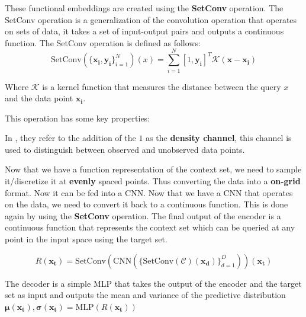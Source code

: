 \documentclass[../../main.tex]{subfiles}
\begin{document}
These functional embeddings are created using the \textbf{SetConv} operation. The SetConv operation is a generalization of the convolution operation that operates on sets of data, it takes a set of input-output pairs and outputs a continuous function. The SetConv operation is defined as follows:
\begin{equation}
	\text{SetConv}(\{\bm{x_i}, \bm{y_i}\}_{i=1}^{N})(x) = \sum_{i=1}^{N} [1, \bm{y_i}] ^ T \mathcal{K}(\bm{x} - \bm{x_i})
\end{equation}

Where $\mathcal{K}$ is a kernel function that measures the distance between the query $x$ and the data point $\bm{x_i}$.

This operation has some key properties:

In \parencite{gordon2020convolutional}, they refer to the addition of the $1$ as the \textbf{density channel}, this channel is used to distinguish between observed and unobserved data points. 


Now that we have a function representation of the context set, we need to sample it/discretize it at \textbf{evenly} spaced points. Thus converting the data into a \textbf{on-grid} format. Now it can be fed into a CNN. Now that we have a CNN that operates on the data, we need to convert it back to a continuous function. This is done again by using the \textbf{SetConv} operation. The final output of the encoder is a continuous function that represents the context set which can be queried at any point in the input space using the target set.

\begin{equation}
	R(\bm{x_t}) = \text{SetConv}(\text{CNN}(\{\text{SetConv}(\mathcal{C})(\bm{x_d})\}_{d=1}^{D}))(\bm{x_t})
\end{equation}



The decoder is a simple MLP that takes the output of the encoder and the target set as input and outputs the mean and variance of the predictive distribution $\bm{\mu}(\bm{x_t}), \bm{\sigma}(\bm{x_t}) = \text{MLP}(R(\bm{x_t}))$


\ifSubfilesClassLoaded{%
    \printbibliography{}
}{} 
\end{document}
